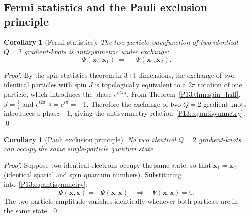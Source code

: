\documentclass[11pt,a4paper]{article}
\newtheorem{corollary}[theorem]{Corollary}
\theoremstyle{definition}
\theoremstyle{remark}
\begin{document}
\subsection{Fermi statistics and the Pauli exclusion principle}
\label{P13:sec:pauli}

\begin{corollary}[Fermi statistics]
\label{P13:cor:fermi_stats}
The two-particle wavefunction of two identical $Q=2$ gradient-knots is
antisymmetric under exchange:
\begin{equation}
  \boxed{\Psi(\mathbf{x}_2,\mathbf{x}_1) \;=\; -\Psi(\mathbf{x}_1,\mathbf{x}_2).}
  \label{P13:eq:antisymmetry}
\end{equation}
\end{corollary}

\begin{proof}
By the spin-statistics theorem in 3+1 dimensions, the exchange of two
identical particles with spin $J$ is topologically equivalent to a
$2\pi$ rotation of one particle, which introduces the phase $e^{i2\pi J}$.
From Theorem~\ref{P13:thm:spin_half}, $J=\tfrac{1}{2}$ and
$e^{i2\pi\cdot\frac{1}{2}}=e^{i\pi}=-1$.
Therefore the exchange of two $Q=2$ gradient-knots introduces a phase $-1$,
giving the antisymmetry relation~\eqref{P13:eq:antisymmetry}.
\qed
\end{proof}

\begin{corollary}[Pauli exclusion principle]
\label{P13:cor:pauli_exclusion}
No two identical $Q=2$ gradient-knots can occupy the same single-particle
quantum state.
\end{corollary}

\begin{proof}
Suppose two identical electrons occupy the same state, so that
$\mathbf{x}_1=\mathbf{x}_2$ (identical spatial and spin quantum numbers).
Substituting into~\eqref{P13:eq:antisymmetry}:
\begin{equation}
  \Psi(\mathbf{x},\mathbf{x}) = -\Psi(\mathbf{x},\mathbf{x})
  \quad\Longrightarrow\quad
  \Psi(\mathbf{x},\mathbf{x}) = 0.
  \label{P13:eq:pauli_zero}
\end{equation}
The two-particle amplitude vanishes identically whenever both particles
are in the same state.
\qed
\end{proof}
\end{document}
